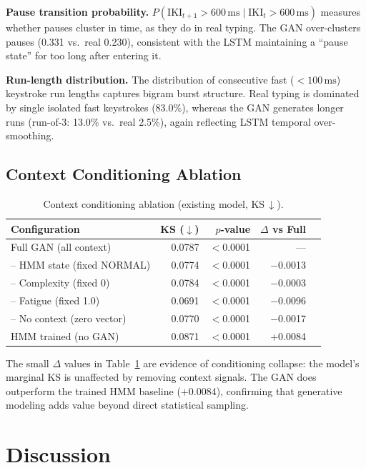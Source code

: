 \documentclass[sigconf,nonacm]{acmart}
\begin{document}
\textbf{Pause transition probability.}
$P(\text{IKI}_{t+1} > 600\,\text{ms} \mid \text{IKI}_t > 600\,\text{ms})$
measures whether pauses cluster in time, as they do in real typing.
The GAN over-clusters pauses (0.331 vs.\ real 0.230), consistent with the
LSTM maintaining a ``pause state'' for too long after entering it.

\textbf{Run-length distribution.}
The distribution of consecutive fast ($< 100\,\text{ms}$) keystroke run
lengths captures bigram burst structure.
Real typing is dominated by single isolated fast keystrokes (83.0\%),
whereas the GAN generates longer runs (run-of-3: 13.0\% vs.\ real 2.5\%),
again reflecting LSTM temporal over-smoothing.

\subsection{Context Conditioning Ablation}

\begin{table}[t]
\centering
\caption{Context conditioning ablation (existing model, KS\,$\downarrow$).}
\begin{tabular}{lrrrr}
\toprule
Configuration & KS ($\downarrow$) & $p$-value & $\Delta$ vs Full \\
\midrule
Full GAN (all context)            & 0.0787 & $<$0.0001 & — \\
\quad -- HMM state (fixed NORMAL) & 0.0774 & $<$0.0001 & $-$0.0013 \\
\quad -- Complexity (fixed 0)     & 0.0784 & $<$0.0001 & $-$0.0003 \\
\quad -- Fatigue (fixed 1.0)      & 0.0691 & $<$0.0001 & $-$0.0096 \\
\quad -- No context (zero vector) & 0.0770 & $<$0.0001 & $-$0.0017 \\
HMM trained (no GAN)              & 0.0871 & $<$0.0001 & $+$0.0084 \\
\bottomrule
\end{tabular}
\label{tab:ctx_ablation}
\end{table}

The small $\Delta$ values in Table~\ref{tab:ctx_ablation} are evidence of
conditioning collapse: the model's marginal KS is unaffected by removing
context signals.
The GAN does outperform the trained HMM baseline ($+$0.0084), confirming
that generative modeling adds value beyond direct statistical sampling.


\section{Discussion}
\end{document}
